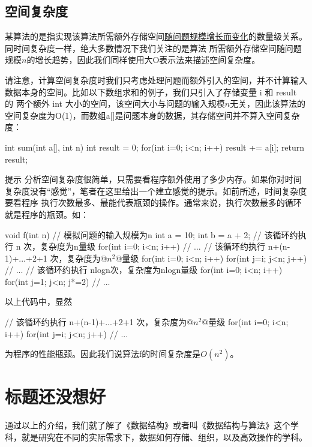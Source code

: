 \subsection{空间复杂度}
某算法的是指实现该算法所需额外存储空间\uline{随问题规模增长而变化}的数量级关系。同时间复杂度一样，绝大多数情况下我们关注的是算法
所需额外存储空间随问题规模\(n\)的增长趋势，因此我们同样使用大O表示法来描述空间复杂度。

请注意，计算空间复杂度时我们只考虑处理问题而额外引入的空间，并不计算输入数据本身的空间。比如以下数组求和的例子，我们只引入了存储变量 i 和 result 的
两个额外 int 大小的空间，该空间大小与问题的输入规模\(n\)无关，因此该算法的空间复杂度为O(1)，而数组a[]是问题本身的数据，其存储空间并不算入空间复杂度：
\begin{cppcode}
int sum(int a[], int n)
{
    int result = 0;
    for(int i=0; i<n; i++)
    {
        result += a[i];
    }
    return result;
}
\end{cppcode}

\begin{notebox}{提示}
    分析空间复杂度很简单，只需要看程序额外使用了多少内存。如果你对时间复杂度没有“感觉”，笔者在这里给出一个建立感觉的提示。如前所述，时间复杂度要看程序
    执行次数最多、最能代表瓶颈的操作。通常来说，执行次数最多的循环就是程序的瓶颈。如：
    \begin{cppcode}
        void f(int n) { // 模拟问题的输入规模为n
            int a = 10;
            int b = a + 2;
            // 该循环约执行 n 次，复杂度为n量级
            for(int i=0; i<n; i++) {
                // ...
            }
            // 该循环约执行 n+(n-1)+...+2+1 次，复杂度为@\(n^2\)@量级
            for(int i=0; i<n; i++) {
                for(int j=i; j<n; j++) {
                    // ...
                }
            }
            // 该循环约执行 nlogn次，复杂度为nlogn量级
            for(int i=0; i<n; i++) {
                for(int j=1; j<n; j*=2) {
                    // ...
                }
            }
        }
    \end{cppcode}
    以上代码中，显然
    \begin{cppcode}
        // 该循环约执行 n+(n-1)+...+2+1 次，复杂度为@\(n^2\)@量级
        for(int i=0; i<n; i++) {
            for(int j=i; j<n; j++) {
                // ...
            }
        }
    \end{cppcode}
    为程序的性能瓶颈。因此我们说算法f的时间复杂度是\(O(n^2)\)。
\end{notebox}

\section{\color{red}\textbf{标题还没想好}}
通过以上的介绍，我们就了解了《数据结构》或者叫《数据结构与算法》这个学科，就是研究在不同的实际需求下，数据如何存储、组织，以及高效操作的学科。

